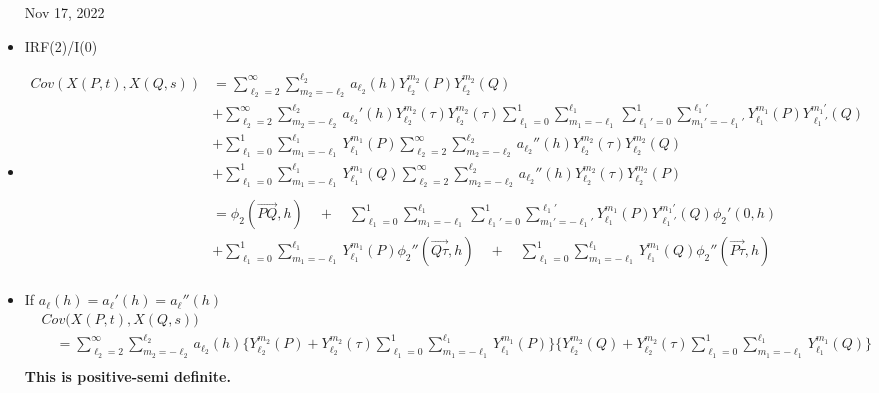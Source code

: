 \documentclass[11pt]{article}
\begin{document}
\begin{itemize}
\pagebreak

Nov 17, 2022

\item IRF(2)/I(0)

\item
\begin{align*}
Cov(X(P,t), X(Q,s)) &= \sum_{\ell_2=2}^{\infty}  \sum_{m_2=-\ell_2}^{\ell_2} a_{\ell_2}(h) Y_{\ell_2}^{m_2}(P) Y_{\ell_2}^{m_2}(Q)\\ 
&+ \sum_{\ell_2=2}^{\infty}  \sum_{m_2=-\ell_2}^{\ell_2} a_{\ell_2}'(h) Y_{\ell_2}^{m_2}(\tau) Y_{\ell_2}^{m_2}(\tau) \sum_{\ell_1=0}^{1} \sum_{m_1=-\ell_1}^{\ell_1} \sum_{{\ell_1}'=0}^{1} \sum_{{m_1}'=-{\ell_1}'}^{{\ell_1}'} Y_{\ell_1}^{m_1}(P) Y_{{\ell_1}'}^{{m_1}'}(Q)\\
&+  \sum_{\ell_1=0}^{1} \sum_{m_1=-\ell_1}^{\ell_1} Y_{\ell_1}^{m_1}(P) \sum_{\ell_2=2}^{\infty}  \sum_{m_2=-\ell_2}^{\ell_2} a_{\ell_2}''(h) Y_{\ell_2}^{m_2}(\tau) Y_{\ell_2}^{m_2}(Q)\\
&+  \sum_{\ell_1=0}^{1} \sum_{m_1=-\ell_1}^{\ell_1} Y_{\ell_1}^{m_1}(Q) \sum_{\ell_2=2}^{\infty}  \sum_{m_2=-\ell_2}^{\ell_2} a_{\ell_2}''(h) Y_{\ell_2}^{m_2}(\tau) Y_{\ell_2}^{m_2}(P)\\
\\
&= \phi_2(\overrightarrow{PQ},h) \quad + \quad \sum_{\ell_1=0}^{1} \sum_{m_1=-\ell_1}^{\ell_1} \sum_{{\ell_1}'=0}^{1} \sum_{{m_1}'=-{\ell_1}'}^{{\ell_1}'} Y_{\ell_1}^{m_1}(P) Y_{{\ell_1}'}^{{m_1}'}(Q) \phi_2'(0,h)\\
&+  \sum_{\ell_1=0}^{1} \sum_{m_1=-\ell_1}^{\ell_1} Y_{\ell_1}^{m_1}(P) \phi_2''(\overrightarrow{Q\tau},h) \quad + \quad  \sum_{\ell_1=0}^{1} \sum_{m_1=-\ell_1}^{\ell_1} Y_{\ell_1}^{m_1}(Q) \phi_2''(\overrightarrow{P\tau},h)\\ 
\end{align*}

\item 
If $a_\ell(h) = a_\ell'(h) = a_\ell''(h)$\\
\begin{align*}
&Cov\biggl(X(P,t), X(Q,s)\biggl)\\
&\quad = \sum_{\ell_2=2}^{\infty}  \sum_{m_2=-\ell_2}^{\ell_2} a_{\ell_2}(h) \biggl \{ Y_{\ell_2}^{m_2}(P) +  Y_{\ell_2}^{m_2}(\tau) \sum_{\ell_1=0}^{1} \sum_{m_1=-\ell_1}^{\ell_1} Y_{\ell_1}^{m_1}(P) \biggl \} \biggl \{ Y_{\ell_2}^{m_2}(Q) +  Y_{\ell_2}^{m_2}(\tau) \sum_{\ell_1=0}^{1} \sum_{m_1=-\ell_1}^{\ell_1} Y_{\ell_1}^{m_1}(Q) \biggl \}\\
\end{align*}
{\color{red} \textbf{This is positive-semi definite.}}\\


\end{itemize}
\end{document}
